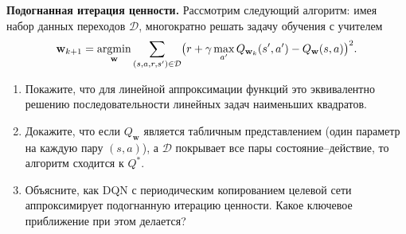 \begin{exercise}
\label{ex:fitted-vi}
\textbf{Подогнанная итерация ценности.} Рассмотрим следующий алгоритм: имея набор данных переходов $\mathcal{D}$, многократно решать задачу обучения с учителем
\[
\mathbf{w}_{k+1} = \operatorname*{argmin}_\mathbf{w} \sum_{(s,a,r,s') \in \mathcal{D}}
\bigl(r + \gamma \max_{a'} Q_{\mathbf{w}_k}(s', a') - Q_\mathbf{w}(s, a)\bigr)^2.
\]
\begin{enumerate}
\item Покажите, что для линейной аппроксимации функций это эквивалентно решению последовательности линейных задач наименьших квадратов.
\item Докажите, что если $Q_\mathbf{w}$ является табличным представлением (один параметр на каждую пару $(s,a)$), а $\mathcal{D}$ покрывает все пары состояние--действие, то алгоритм сходится к $Q^*$.
\item Объясните, как DQN с периодическим копированием целевой сети аппроксимирует подогнанную итерацию ценности.  Какое ключевое приближение при этом делается?
\end{enumerate}
\end{exercise}
